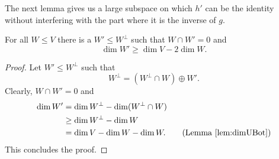 The next lemma gives us a large subspace on which $h'$ can be the identity without interfering with the part where it is the inverse of $g$.

\begin{lemma}\label{lem:largeOrthogonal}
For all $W\leq V$ there is a $W'\leq W^\bot$ such that $W\cap W'=0$ and \[\dim W'\geq \dim V-2\dim W.\]
\end{lemma}
\begin{proof}
Let $W'\leq W^\bot$ such that 
\[W^\bot=(W^\bot\cap W)\oplus W'.\]
Clearly, $W\cap W'=0$ and 
\begin{align*}
\dim W'&=\dim W^\bot - \dim (W^\bot\cap W)\\
&\geq \dim W^\bot- \dim W\\
&=\dim V-\dim W-\dim W .\tag{Lemma \ref{lem:dimUBot}}
\end{align*}
This concludes the proof.
\end{proof}



